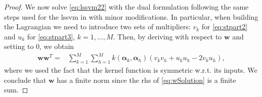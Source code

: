\documentclass[draftcls,onecolumn,12pt]{IEEEtran}
\newcommand{\wrt}{w.r.t. }
\begin{document}
\begin{proof}
We now solve \eqref{eq:lssvm22} with the dual formulation following the same steps used for the \ac{lssvm} in \cite{Suykens1999} with minor modifications. In particular, when building the Lagrangian we need to introduce two sets of multipliers: $v_k$ for \eqref{eq:stpart2} and $u_k$ for \eqref{eq:stpart3}, $k=1,\dots, M$. Then, by deriving with respect to $\mathbf{w}$ and setting to 0, we obtain 
\begin{equation}
\label{eq:wSolution}
\begin{aligned}
	\mathbf{w}\mathbf{w}^T =&  \sum_{k=1}^{M} \sum_{h=1}^{M} k(\bm{\alpha}_k,\bm{\alpha}_h) (v_kv_h + u_ku_h -2 v_ku_h),
\end{aligned}
\end{equation}
where we used the fact that the kernel function is symmetric \wrt its inputs. We conclude that $\mathbf{w}$ has a finite norm since the rhs of \eqref{eq:wSolution} is a finite sum.

\end{proof}
\end{document}
